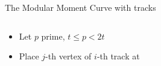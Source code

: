 \documentclass[t]{beamer}
\begin{document}
\begin{frame}{The Modular Moment Curve with tracks}
    \vspace{-0.5cm}
    \begin{columns}
	\begin{column}{0.5\textwidth}
		\begin{itemize}
		    \item <+-> Let $p$ prime, $t\le p<2t$
		    \item
			Place $j$-th vertex of $i$-th track at  \\
		\end{itemize}
	\end{column}
	    \begin{column}{0.5\textwidth}
		\begin{center}
		\end{center}
	    \end{column}
    \end{columns}
\end{frame}
\end{document}
